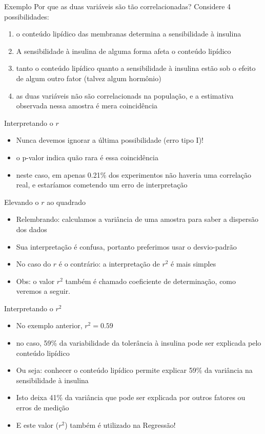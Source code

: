 \documentclass{beamer}
\begin{document}
\begin{frame}{Exemplo}
  Por que as duas variáveis são tão correlacionadas? Considere 4
  possibilidades:
  \begin{enumerate}
  \item o conteúdo lipídico das membranas \alert<1>{determina} a
    sensibilidade à insulina
  \item A sensibilidade à insulina de alguma forma afeta o conteúdo lipídico
  \item tanto o conteúdo lipídico quanto a sensibilidade à insulina
    estão sob o efeito de \alert<3>{algum outro} fator (talvez algum hormônio)
  \item as duas variáveis não são correlacionads na população, e a
    estimativa observada nessa amostra é mera coincidência
  \end{enumerate}
\end{frame}

\begin{frame}{Interpretando o $r$}
  \begin{itemize}
  \item Nunca devemos ignorar a última possibilidade (erro tipo I)!
  \item o p-valor indica quão rara é essa coincidência
  \item neste caso, em apenas 0.21\% dos experimentos não haveria uma
    correlação real, e estaríamos cometendo um erro de interpretação
  \end{itemize}
\end{frame}

\begin{frame}{Elevando o $r$ ao quadrado}
  \begin{itemize}
  \item Relembrando: calculamos a variância de uma amostra para saber
    a dispersão dos dados
  \item Sua interpretação é confusa, portanto preferimos usar o
    desvio-padrão
  \item No caso do $r$ é o contrário: a interpretação de $r^2$ é mais simples
  \item Obs: o valor $r^2$ também é chamado \alert{coeficiente de
      determinação}, como veremos a seguir.
  \end{itemize}
\end{frame}

\begin{frame}{Interpretando o $r^2$}
  \begin{itemize}
  \item No exemplo anterior, $r^2 = 0.59$
  \item no caso, 59\% da variabilidade da tolerância à insulina pode
    ser explicada pelo conteúdo lipídico
  \item Ou seja: conhecer o conteúdo lipídico permite explicar 59\%
    da variância na sensibilidade à insulina
  \item Isto deixa 41\% da variância que pode ser explicada por outros
    fatores ou erros de medição
  \item E este valor ($r^2$) também é utilizado na Regressão!
  \end{itemize}
\end{frame}
\end{document}
